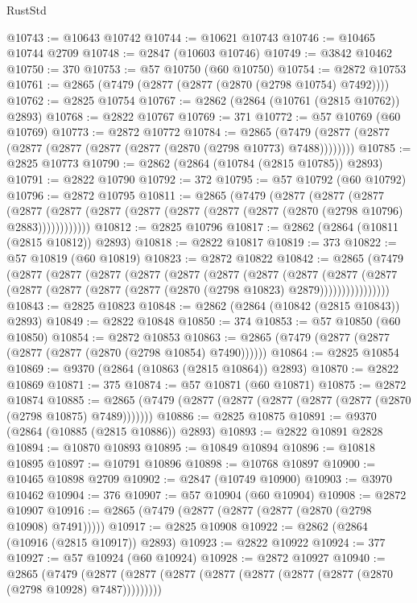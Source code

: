 \begin{lexlean}{RustStd}
\begin{coremodule}
@10743 := @10643 @10742
@10744 := @10621 @10743
@10746 := @10465 @10744 @2709
@10748 := @2847 (@10603 @10746)
@10749 := @3842 @10462
@10750 := 370
@10753 := @57 @10750 (@60 @10750)
@10754 := @2872 @10753
@10761 := @2865 (@7479 (@2877 (@2877 (@2870 (@2798 @10754) @7492))))
@10762 := @2825 @10754
@10767 := @2862 (@2864 (@10761 (@2815 @10762)) @2893)
@10768 := @2822 @10767
@10769 := 371
@10772 := @57 @10769 (@60 @10769)
@10773 := @2872 @10772
@10784 := @2865 (@7479 (@2877 (@2877 (@2877 (@2877 (@2877 (@2877 (@2870 (@2798 @10773) @7488))))))))
@10785 := @2825 @10773
@10790 := @2862 (@2864 (@10784 (@2815 @10785)) @2893)
@10791 := @2822 @10790
@10792 := 372
@10795 := @57 @10792 (@60 @10792)
@10796 := @2872 @10795
@10811 := @2865
    (@7479
      (@2877
        (@2877
          (@2877
            (@2877 (@2877 (@2877 (@2877 (@2877 (@2877 (@2877 (@2870 (@2798 @10796) @2883))))))))))))
@10812 := @2825 @10796
@10817 := @2862 (@2864 (@10811 (@2815 @10812)) @2893)
@10818 := @2822 @10817
@10819 := 373
@10822 := @57 @10819 (@60 @10819)
@10823 := @2872 @10822
@10842 := @2865
    (@7479
      (@2877
        (@2877
          (@2877
            (@2877
              (@2877
                (@2877
                  (@2877
                    (@2877
                      (@2877
                        (@2877
                          (@2877 (@2877 (@2877 (@2877 (@2870 (@2798 @10823) @2879))))))))))))))))
@10843 := @2825 @10823
@10848 := @2862 (@2864 (@10842 (@2815 @10843)) @2893)
@10849 := @2822 @10848
@10850 := 374
@10853 := @57 @10850 (@60 @10850)
@10854 := @2872 @10853
@10863 := @2865 (@7479 (@2877 (@2877 (@2877 (@2877 (@2870 (@2798 @10854) @7490))))))
@10864 := @2825 @10854
@10869 := @9370 (@2864 (@10863 (@2815 @10864)) @2893)
@10870 := @2822 @10869
@10871 := 375
@10874 := @57 @10871 (@60 @10871)
@10875 := @2872 @10874
@10885 := @2865 (@7479 (@2877 (@2877 (@2877 (@2877 (@2877 (@2870 (@2798 @10875) @7489)))))))
@10886 := @2825 @10875
@10891 := @9370 (@2864 (@10885 (@2815 @10886)) @2893)
@10893 := @2822 @10891 @2828
@10894 := @10870 @10893
@10895 := @10849 @10894
@10896 := @10818 @10895
@10897 := @10791 @10896
@10898 := @10768 @10897
@10900 := @10465 @10898 @2709
@10902 := @2847 (@10749 @10900)
@10903 := @3970 @10462
@10904 := 376
@10907 := @57 @10904 (@60 @10904)
@10908 := @2872 @10907
@10916 := @2865 (@7479 (@2877 (@2877 (@2877 (@2870 (@2798 @10908) @7491)))))
@10917 := @2825 @10908
@10922 := @2862 (@2864 (@10916 (@2815 @10917)) @2893)
@10923 := @2822 @10922
@10924 := 377
@10927 := @57 @10924 (@60 @10924)
@10928 := @2872 @10927
@10940 := @2865
    (@7479 (@2877 (@2877 (@2877 (@2877 (@2877 (@2877 (@2877 (@2870 (@2798 @10928) @7487)))))))))

\end{coremodule}
\end{lexlean}
